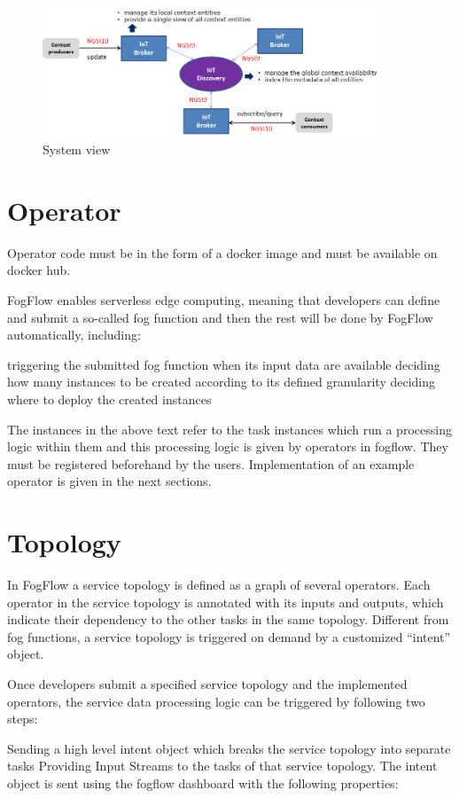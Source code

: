 \documentclass[11pt]{article}
\begin{document}
\begin{figure}[h]
    \centering
    \includegraphics[width=0.9\textwidth]{Images/distributed-brokers.png}
    \caption{System view}
\end{figure}{}

\section{Operator}
Operator code must be in the form of a docker image and must be available on docker hub.

FogFlow enables serverless edge computing, meaning that developers can define and submit a so-called fog function and then the rest will be done by FogFlow automatically, including:

triggering the submitted fog function when its input data are available
deciding how many instances to be created according to its defined granularity
deciding where to deploy the created instances

The instances in the above text refer to the task instances which run a processing logic within them and this processing logic is given by operators in fogflow. They must be registered beforehand by the users. Implementation of an example operator is given in the next sections.

\section{Topology}
In FogFlow a service topology is defined as a graph of several operators. Each operator in the service topology is annotated with its inputs and outputs, which indicate their dependency to the other tasks in the same topology. Different from fog functions, a service topology is triggered on demand by a customized “intent” object.

Once developers submit a specified service topology and the implemented operators, the service data processing logic can be triggered by following two steps:

Sending a high level intent object which breaks the service topology into separate tasks
Providing Input Streams to the tasks of that service topology.
The intent object is sent using the fogflow dashboard with the following properties:
\end{document}
